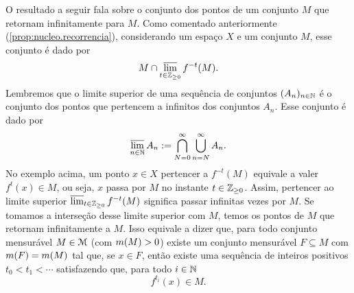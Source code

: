 O resultado a seguir fala sobre o conjunto dos pontos de um conjunto $M$ que retornam infinitamente para $M$. Como comentado anteriormente (\ref{prop:nucleo.recorrencia}), considerando um espaço $X$ e um conjunto $M$, esse conjunto é dado por
	\begin{equation*}
	M \cap \varlimsup_{t \in \mathbb{Z}_{\geq 0}} f^{-t}(M).
	\end{equation*}
Lembremos que o limite superior de uma sequência de conjuntos $(A_n)_{n \in \mathbb{N}}$ é o conjunto dos pontos que pertencem a infinitos dos conjuntos $A_n$. Esse conjunto é dado por
	\begin{equation*}
	\varlimsup_{n \in \mathbb{N}} A_n := \bigcap_{N=0}^{\infty} \bigcup_{n=N}^{\infty} A_n.
	\end{equation*}
No exemplo acima, um ponto $x \in X$ pertencer a $f^{-t}(M)$ equivale a valer $f^t(x) \in M$, ou seja, $x$ passa por $M$ no instante $t \in \mathbb{Z}_{\geq 0}$. Assim, pertencer ao limite superior $\varlimsup_{t \in \mathbb{Z}_{\geq 0}} f^{-t}(M)$ significa passar infinitas vezes por $M$. Se tomamos a interseção desse limite superior com $M$, temos os pontos de $M$ que retornam infinitamente a $M$. Isso equivale a dizer que, para todo conjunto mensurável $M \in \mathcal{M}$ (com $m(M)>0$) existe um conjunto mensurável $F \subseteq M$ com $m(F)=m(M)$ tal que, se $x \in F$, então existe uma sequência de inteiros positivos $t_0 < t_1 < \cdots$ satisfazendo que, para todo $i \in \mathbb{N}$
	\begin{equation*}
	f^{t_i}(x) \in M.
	\end{equation*}

